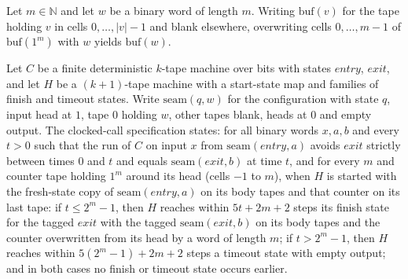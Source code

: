 \begin{theorem}
\label{Turing.NTimeDiag.qy_wordPatch_ones}
\leanok
{}
Let $m \in \mathbb{N}$ and let $w$ be a binary word of length $m$. Writing $\mathrm{buf}(v)$ for
the tape holding $v$ in cells $0, \dots, |v| - 1$ and blank elsewhere, overwriting cells
$0, \dots, m - 1$ of $\mathrm{buf}(1^m)$ with $w$ yields $\mathrm{buf}(w)$.
\end{theorem}

\begin{definition}
\label{Turing.NTimeDiag.QyClockSpec}
\leanok
{}
Let $C$ be a finite deterministic $k$-tape machine over bits with states $\mathit{entry}$,
$\mathit{exit}$, and let $H$ be a $(k+1)$-tape machine with a start-state map and families of
finish and timeout states. Write $\mathrm{seam}(q, w)$ for the configuration with state $q$,
input head at $1$, tape $0$ holding $w$, other tapes blank, heads at $0$ and empty output. The
clocked-call specification states: for all binary words $x, a, b$ and every $t > 0$ such that the
run of $C$ on input $x$ from $\mathrm{seam}(\mathit{entry}, a)$ avoids $\mathit{exit}$ strictly
between times $0$ and $t$ and equals $\mathrm{seam}(\mathit{exit}, b)$ at time $t$, and for every
$m$ and counter tape holding $1^m$ around its head (cells $-1$ to $m$), when $H$ is started with
the fresh-state copy of $\mathrm{seam}(\mathit{entry}, a)$ on its body tapes and that counter on
its last tape: if $t \le 2^m - 1$, then $H$ reaches within $5t + 2m + 2$ steps its finish state
for the tagged $\mathit{exit}$ with the tagged $\mathrm{seam}(\mathit{exit}, b)$ on its body tapes
and the counter overwritten from its head by a word of length $m$; if $t > 2^m - 1$, then $H$
reaches within $5(2^m - 1) + 2m + 2$ steps a timeout state with empty output; and in both cases
no finish or timeout state occurs earlier.
\end{definition}

